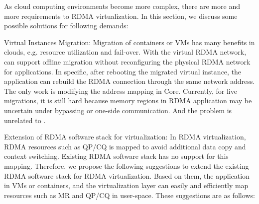 As cloud computing environments become more complex, there are more and more  requirements to RDMA virtualization. In this section, we discuss some possible solutions for following demands:


Virtual Instances Migration:  Migration of containers or VMs has many benefits in clouds, e.g. resource utilization and fail-over. With the virtual RDMA network, \sys can support offline migration without reconfiguring the physical RDMA network for applications. In specific, after rebooting the migrated virtual instance, the application can rebuild the RDMA connection through the same network address. The only work is modifying the address mapping in \sys Core. Currently, for live migrations, it is still hard because memory regions in RDMA application may be uncertain under bypassing or one-side communication. And the problem is unrelated to \sys.


Extension of RDMA software stack for virtualization: In RDMA virtualization, RDMA resources such as QP/CQ is mapped to avoid additional data copy and context switching. Existing RDMA software stack has no support for this mapping. Therefore, we propose the following suggestions to extend the existing RDMA software stack for RDMA virtualization. Based on them, the application in VMs or containers, and the virtualization layer can easily and efficiently map resources such as MR and QP/CQ in user-space. These suggestions are as follows:


